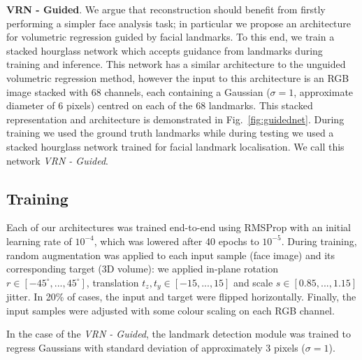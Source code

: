 
\textbf{VRN - Guided}. We argue that reconstruction should benefit from firstly performing a simpler face analysis task; in particular we propose an architecture for
volumetric regression guided by facial landmarks. To this end, we train a stacked hourglass network which
accepts guidance from landmarks during training and
inference. This network has a similar architecture to the unguided volumetric regression method, however the input to this architecture is an RGB image stacked with 68 channels, each containing a Gaussian ($\sigma = 1$, approximate diameter of 6 pixels) centred on each of
the 68 landmarks. This stacked representation and architecture is demonstrated in Fig.~\ref{fig:guidednet}. During training we used the ground truth landmarks while during testing we used a stacked hourglass network trained for facial landmark localisation. We call this network \textit{VRN - Guided}.




\subsection{Training}

Each of our architectures was trained end-to-end using RMSProp with an initial learning rate of $10^{-4}$, which was lowered after 40 epochs to $10^{-5}$. During training, random augmentation was applied to each
input sample (face image) and its corresponding target (3D volume): we applied in-plane rotation $r\in[-45^{\circ}, ..., 45^{\circ}]$, translation  $t_z,t_y\in[-15,...,15]$ and scale
$s\in [0.85,...,1.15]$ jitter. In 20\% of cases, the input and target were flipped horizontally. Finally, the input samples were adjusted with some colour scaling on each RGB channel. %

In the case of the \textit{VRN - Guided}, the landmark detection module was trained to regress Gaussians with standard deviation of approximately 3 pixels ($\sigma = 1$). %

